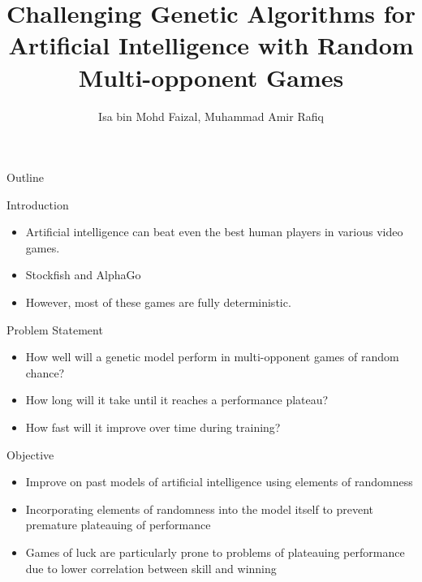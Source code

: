 \documentclass{beamer}
\title{Challenging Genetic Algorithms for Artificial Intelligence with Random Multi-opponent Games}
\author{Isa bin Mohd Faizal, Muhammad Amir Rafiq}
\institute{Universiti Kebangsaan Malaysia}
\begin{document}
	
	
\begin{frame}[plain]
    \maketitle
\end{frame}

\begin{frame}{Outline}

	\tableofcontents
	
\end{frame}

\begin{frame}{Introduction}
	
	\begin{itemize}
		\item  Artificial intelligence can beat even the best human players in various video games.
		\item Stockfish and AlphaGo
		\item However, most of these games are fully deterministic.
		
	\end{itemize}
	
	
\end{frame}

\begin{frame}{Problem Statement}

	\begin{itemize}
		
		\item How well will a genetic model perform in multi-opponent games of random chance?
		\item How long will it take until it reaches a performance plateau?
		\item How fast will it improve over time during training?
		
		
	\end{itemize}

\end{frame}

\begin{frame}{Objective}
	
	\begin{itemize}
		
		\item Improve on past models of artificial intelligence using elements of randomness
		\item Incorporating elements of randomness into the model itself to prevent premature plateauing of performance
		\item Games of luck are particularly prone to problems of plateauing performance due to lower correlation between skill and winning
		
	\end{itemize}
	
\end{frame}
\end{document}
